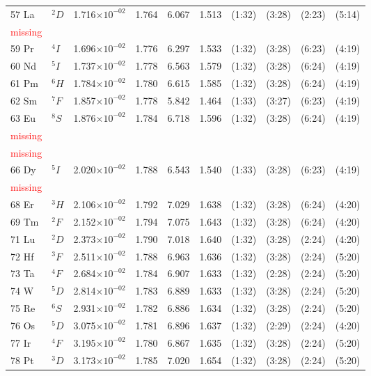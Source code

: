 \documentclass[12pt]{report}
\newcommand{\notetodylan}[1]{\textcolor{red}{#1}} %
\begin{document}
\begin{longtable}{l l r r r r r r r r}
57 La & $^{2}D$ & 1.716$\times10^{-02}$ & 1.764 & 6.067 & 1.513 & (1:32) & (3:28) & (2:23) & (5:14) \\
\notetodylan{missing}	\\
59 Pr & $^{4}I$ & 1.696$\times10^{-02}$ & 1.776 & 6.297 & 1.533 & (1:32) & (3:28) & (6:23) & (4:19) \\
60 Nd & $^{5}I$ & 1.737$\times10^{-02}$ & 1.778 & 6.563 & 1.579 & (1:32) & (3:28) & (6:24) & (4:19) \\
61 Pm & $^{6}H$ & 1.784$\times10^{-02}$ & 1.780 & 6.615 & 1.585 & (1:32) & (3:28) & (6:24) & (4:19) \\
62 Sm & $^{7}F$ & 1.857$\times10^{-02}$ & 1.778 & 5.842 & 1.464 & (1:33) & (3:27) & (6:23) & (4:19) \\
63 Eu & $^{8}S$ & 1.876$\times10^{-02}$ & 1.784 & 6.718 & 1.596 & (1:32) & (3:28) & (6:24) & (4:19) \\
\notetodylan{missing}	\\
\notetodylan{missing}	\\
66 Dy & $^{5}I$ & 2.020$\times10^{-02}$ & 1.788 & 6.543 & 1.540 & (1:33) & (3:28) & (6:23) & (4:19) \\
\notetodylan{missing}	\\
68 Er & $^{3}H$ & 2.106$\times10^{-02}$ & 1.792 & 7.029 & 1.638 & (1:32) & (3:28) & (6:24) & (4:20) \\
69 Tm & $^{2}F$ & 2.152$\times10^{-02}$ & 1.794 & 7.075 & 1.643 & (1:32) & (3:28) & (6:24) & (4:20) \\
71 Lu & $^{2}D$ & 2.373$\times10^{-02}$ & 1.790 & 7.018 & 1.640 & (1:32) & (3:28) & (2:24) & (4:20) \\
72 Hf & $^{3}F$ & 2.511$\times10^{-02}$ & 1.788 & 6.963 & 1.636 & (1:32) & (3:28) & (2:24) & (5:20) \\
73 Ta & $^{4}F$ & 2.684$\times10^{-02}$ & 1.784 & 6.907 & 1.633 & (1:32) & (2:28) & (2:24) & (5:20) \\
74 W & $^{5}D$ & 2.814$\times10^{-02}$ & 1.783 & 6.889 & 1.633 & (1:32) & (3:28) & (2:24) & (5:20) \\
75 Re & $^{6}S$ & 2.931$\times10^{-02}$ & 1.782 & 6.886 & 1.634 & (1:32) & (3:28) & (2:24) & (5:20) \\
76 Os & $^{5}D$ & 3.075$\times10^{-02}$ & 1.781 & 6.896 & 1.637 & (1:32) & (2:29) & (2:24) & (4:20) \\
77 Ir & $^{4}F$ & 3.195$\times10^{-02}$ & 1.780 & 6.867 & 1.635 & (1:32) & (3:28) & (2:24) & (5:20) \\
78 Pt & $^{3}D$ & 3.173$\times10^{-02}$ & 1.785 & 7.020 & 1.654 & (1:32) & (3:28) & (2:24) & (5:20) \\

\end{longtable}
\end{document}
